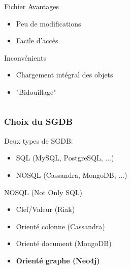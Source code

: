 \documentclass{beamer}
\begin{document}
\begin{frame}
\begin{columns}[t]
\begin{column}{4cm}
\begin{block}{Fichier}
                            \pause
                            Avantages
                            \begin{itemize}
                                \pause
                                \item Peu de modifications
                                \pause
                                \item Facile d'accès
                            \end{itemize}
                            \pause
                            Inconvénients 
                            \begin{itemize}
                                \pause
                                \item Chargement intégral des objets
                                \pause
                                \item "Bidouillage"
                            \end{itemize}
                        \end{block}
                    \end{column}
                \end{columns}
            \end{frame}
            \begin{frame}
                \frametitle{Choix du SGDB}
                Deux types de SGDB:
                \pause
                \begin{itemize}
                    \item SQL (MySQL, PostgreSQL, ...)
                    \pause
                    \item NOSQL (Cassandra, MongoDB, ...)
                \end{itemize}
                \pause
                \begin{block}{NOSQL (Not Only SQL)}
                    \pause
                    \begin{itemize}
                        \item Clef/Valeur (Riak)
                        \pause
                        \item Orienté colonne (Cassandra)
                        \pause
                        \item Orienté document (MongoDB)
                        \pause
                        \item \textbf{Orienté graphe (Neo4j)}
                    \end{itemize}
                \end{block}
            \end{frame}
\end{document}
